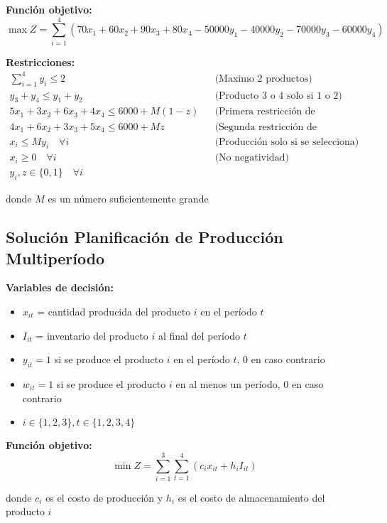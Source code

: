 \documentclass[12pt]{article}
\begin{document}
\textbf{Función objetivo:}
$$\max Z = \sum_{i=1}^{4} (70x_1 + 60x_2 + 90x_3 + 80x_4 - 50000y_1 - 40000y_2 - 70000y_3 - 60000y_4)$$

\textbf{Restricciones:}
\begin{align*}
    \sum_{i=1}^{4} y_i \leq 2 && \text{(Maximo 2 productos)} \\
    y_3 + y_4 \leq y_1 + y_2 && \text{(Producto 3 o 4 solo si 1 o 2)} \\
    5x_1 + 3x_2 + 6x_3 + 4x_4 \leq 6000 + M(1-z) && \text{(Primera restricción de capacidad)} \\
    4x_1 + 6x_2 + 3x_3 + 5x_4 \leq 6000 + Mz && \text{(Segunda restricción de capacidad)} \\
    x_i \leq My_i \quad \forall i && \text{(Producción solo si se selecciona)} \\
    x_i \geq 0 \quad \forall i && \text{(No negatividad)} \\
    y_i, z \in \{0,1\} \quad \forall i
\end{align*}
\begin{center}
donde $M$ es un número suficientemente grande
\end{center}

\subsection{Solución Planificación de Producción Multiperíodo}

\textbf{Variables de decisión:}
\begin{itemize}
    \item $x_{it}$ = cantidad producida del producto $i$ en el período $t$
    \item $I_{it}$ = inventario del producto $i$ al final del período $t$
    \item $y_{it} = 1$ si se produce el producto $i$ en el período $t$, 0 en caso contrario
    \item $w_{it} = 1$ si se produce el producto $i$ en al menos un período, 0 en caso contrario
    \item $i \in \{1, 2, 3\}, t \in \{1, 2, 3, 4\}$
\end{itemize}

\textbf{Función objetivo:}
$$\min Z = \sum_{i=1}^{3} \sum_{t=1}^{4} (c_i x_{it} + h_i I_{it})$$
\begin{center}
donde $c_i$ es el costo de producción y $h_i$ es el costo de almacenamiento del producto $i$
\end{center}
\end{document}
